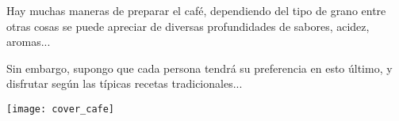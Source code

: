 \newpage
Hay muchas maneras de preparar el café, dependiendo del tipo de grano entre otras cosas se puede apreciar de diversas profundidades de sabores, acidez, aromas...

Sin embargo, supongo que cada persona tendrá su preferencia en esto último, y disfrutar según las típicas recetas tradicionales...

\begin{center}
\texttt{[image: cover\_cafe]}
\end{center}
